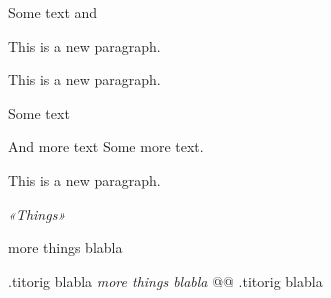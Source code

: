 Some text and

This is a new paragraph.


This is a new paragraph.

Some text

And more text
Some more text.

This is a new paragraph.

\emph{«Things»}

more things
blabla

.titorig
blabla
\emph{more things
blabla}
@@ .titorig
blabla


